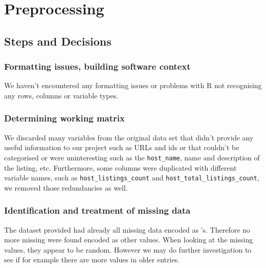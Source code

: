 

\section{Preprocessing}%
\label{sec:preprocessing}


\subsection{Steps and Decisions}%

\subsubsection{Formatting issues, building software context}

We haven't encountered any formatting issues or problems with R not recognising
any rows, columns or variable types.

\subsubsection{Determining working matrix}%
\label{ssub:work_matrix}

We discarded many variables from the original data set that didn't provide any
useful information to our project such as URLs and ids or that couldn't be
categorised or were uninteresting such as the \texttt{host\_name}, name and
description of the listing, etc. Furthermore, some columns were duplicated with
different variable names, such as \texttt{host\_listings\_count} and
\texttt{host\_total\_listings\_count}, we removed those redundancies as well.

\subsubsection{Identification and treatment of missing data}

The dataset provided had already all missing data encoded as \NA's. Therefore no
more missing were found encoded as other values. When looking at the missing
values, they appear to be random. However we may do further investigation to see
if for example there are more values in older entries.

